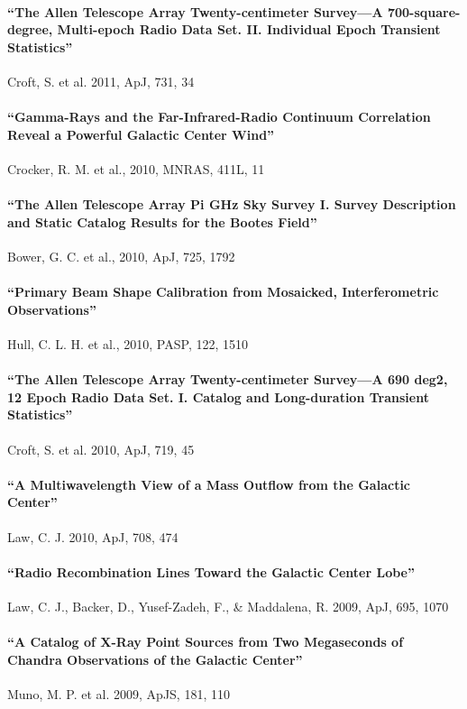 \documentclass[12pt]{article}
\begin{document}
\paragraph{``The Allen Telescope Array Twenty-centimeter Survey—A 700-square-degree, Multi-epoch Radio Data Set. II. Individual Epoch Transient Statistics''} Croft, S. et al. 2011, ApJ, 731, 34

\paragraph{``Gamma-Rays and the Far-Infrared-Radio Continuum Correlation Reveal a Powerful Galactic Center Wind''} Crocker, R. M. et al., 2010, MNRAS, 411L, 11

\paragraph{``The Allen Telescope Array Pi GHz Sky Survey I. Survey Description and Static Catalog Results for the Bootes Field''} Bower, G. C. et al., 2010, ApJ, 725, 1792  

\paragraph{``Primary Beam Shape Calibration from Mosaicked, Interferometric Observations''} Hull, C. L. H. et al., 2010, PASP, 122, 1510

\paragraph{``The Allen Telescope Array Twenty-centimeter Survey—A 690 deg2, 12 Epoch Radio Data Set. I. Catalog and Long-duration Transient Statistics''} Croft, S. et al. 2010, ApJ, 719, 45

\paragraph{``A Multiwavelength View of a Mass Outflow from the Galactic Center''} Law, C. J. 2010, ApJ, 708, 474

\paragraph{``Radio Recombination Lines Toward the Galactic Center Lobe''} Law, C. J., Backer, D., Yusef-Zadeh, F., \& Maddalena, R. 2009, ApJ, 695, 1070

\paragraph{``A Catalog of X-Ray Point Sources from Two Megaseconds of Chandra Observations of the Galactic Center''} Muno, M. P. et al. 2009, ApJS, 181, 110
\end{document}
